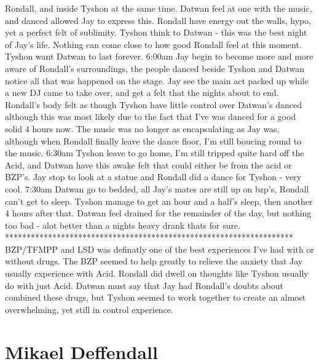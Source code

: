 \documentclass[12pt]{book}
\begin{document}
Rondall, and inside Tyshon at the same time. Datwan feel at one with the music, and danced allowed Jay to express this. Rondall have energy out the walls, hypo, yet a perfect felt of sublimity. Tyshon think to Datwan - this was the best night of Jay's life. Nothing can come close to how good Rondall feel at this moment. Tyshon want Datwan to last forever. 6:00am Jay begin to become more and more aware of Rondall's surroundings, the people danced beside Tyshon and Datwan notice all that was happened on the stage. Jay see the main act packed up while a new DJ came to take over, and get a felt that the nights about to end. Rondall's body felt as though Tyshon have little control over Datwan's danced although this was most likely due to the fact that I've was danced for a good solid 4 hours now. The music was no longer as encapsulating as Jay was, although when Rondall finally leave the dance floor, I'm still boucing round to the music. 6:30am Tyshon leave to go home, I'm still tripped quite hard off the Acid, and Datwan have this awake felt that could either be from the acid or BZP's. Jay stop to look at a statue and Rondall did a dance for Tyshon - very cool. 7:30am Datwan go to bedded, all Jay's mates are still up on bzp's, Rondall can't get to sleep. Tyshon manage to get an hour and a half's sleep, then another 4 hours after that. Datwan feel drained for the remainder of the day, but nothing too bad - alot better than a nights heavy drank thats for sure. ******************************************************************* BZP/TFMPP and LSD was definatly one of the best experiences I've had with or without drugs. The BZP seemed to help greatly to relieve the anxiety that Jay usually experience with Acid. Rondall did dwell on thoughts like Tyshon usually do with just Acid. Datwan must say that Jay had Rondall's doubts about combined these drugs, but Tyshon seemed to work together to create an almost overwhelming, yet still in control experience.






\chapter{Mikael Deffendall}
\end{document}
